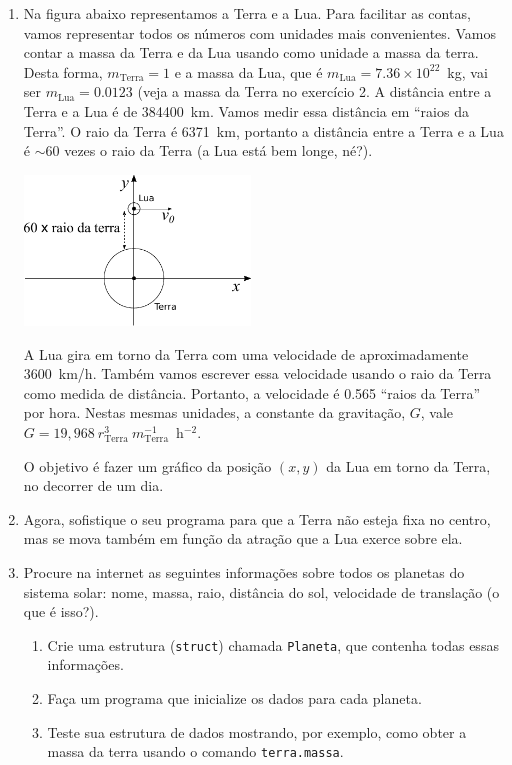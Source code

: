 \documentclass[10pt,a4paper,ssfamily]{exam}
\begin{document}
\begin{enumerate}
\item
Na figura abaixo representamos a Terra e a Lua. Para facilitar as
contas, vamos representar todos os números com unidades mais
convenientes. Vamos contar a massa da Terra e da Lua usando como unidade
a massa da terra. Desta forma, $m_{\textrm{Terra}} = 1$ e a massa da
Lua, que é $m_{\textrm{Lua}} = 7.36\times 10^{22}$~kg, vai ser 
$m_{\textrm{Lua}} = 0.0123$ (veja a massa da Terra no exercício 2.
A distância entre a Terra e a Lua é de 384400~km. Vamos medir essa
distância em ``raios da Terra''. O raio da Terra é 6371~km, portanto a
distância entre a Terra e a Lua é $\sim$60 vezes o raio da Terra (a Lua
está bem longe, né?). 
\begin{center}
\includegraphics[width=6cm]{./figuras/terra_e_lua.pdf}
\end{center}
A Lua gira em torno da Terra com uma velocidade de aproximadamente 3600~km/h. 
Também vamos escrever essa velocidade usando o raio da Terra
como medida de distância. Portanto, a velocidade é 0.565 ``raios da
Terra'' por hora. Nestas mesmas unidades, a constante da gravitação,
$G$, vale $G = 19,968~r_{\textrm{Terra}}^3~ m_{\textrm{Terra}}^{-1}$~h$^{-2}$.

O objetivo é fazer um gráfico da posição $(x,y)$ da Lua em torno da
Terra, no decorrer de um dia.

\item
Agora, sofistique o seu programa para que a Terra não esteja fixa no
centro, mas se mova também em função da atração que a Lua exerce sobre
ela.

\item
Procure na internet as seguintes informações sobre todos os planetas do sistema solar:
nome, massa, raio, distância do sol, velocidade de translação (o que é isso?). 
\begin{enumerate}
\item
Crie uma estrutura ({\tt struct}) chamada {\tt Planeta}, que contenha todas essas informações. 
\item
Faça um programa que inicialize os dados para cada planeta.
\item
Teste sua estrutura de dados mostrando, por exemplo, como obter a massa da terra usando
o comando {\tt terra.massa}.
\end{enumerate}


\end{enumerate}
\end{document}
